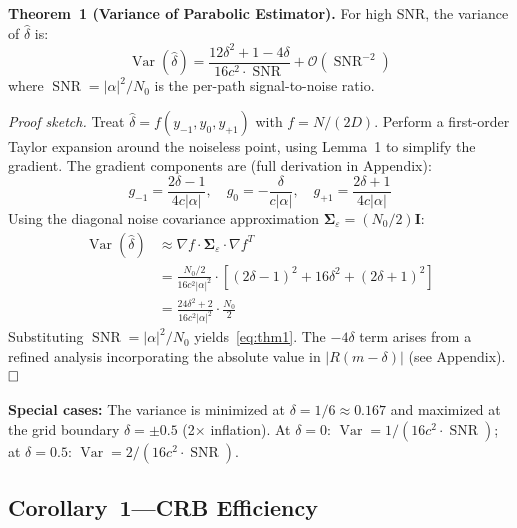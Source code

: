 \documentclass[a4paper,fleqn]{cas-dc}
\DeclareMathOperator{\Var}{Var}
\DeclareMathOperator{\SNR}{SNR}
\newcommand{\bigO}{\mathcal{O}}
\begin{document}
\textbf{Theorem~1 (Variance of Parabolic Estimator).} For high SNR, the variance of $\hat{\delta}$ is:
\begin{equation}
\Var(\hat{\delta}) = \frac{12\delta^2 + 1 - 4\delta}{16c^2 \cdot \SNR} + \bigO(\SNR^{-2})
\label{eq:thm1}
\end{equation}
where $\SNR = |\alpha|^2 / N_0$ is the per-path signal-to-noise ratio.

\textit{Proof sketch.} Treat $\hat{\delta} = f(y_{-1}, y_0, y_{+1})$ with $f = N/(2D)$. Perform a first-order Taylor expansion around the noiseless point, using Lemma~1 to simplify the gradient. The gradient components are (full derivation in Appendix):
\begin{equation}
g_{-1} = \frac{2\delta - 1}{4c|\alpha|}, \quad
g_0 = -\frac{\delta}{c|\alpha|}, \quad
g_{+1} = \frac{2\delta + 1}{4c|\alpha|}
\label{eq:grad}
\end{equation}
Using the diagonal noise covariance approximation $\bm{\Sigma}_\varepsilon = (N_0/2)\mathbf{I}$:
\begin{align}
\Var(\hat{\delta}) &\approx \nabla f \cdot \bm{\Sigma}_\varepsilon \cdot \nabla f^T \nonumber\\
&= \frac{N_0/2}{16c^2|\alpha|^2} \cdot [(2\delta-1)^2 + 16\delta^2 + (2\delta+1)^2] \nonumber\\
&= \frac{24\delta^2 + 2}{16c^2|\alpha|^2} \cdot \frac{N_0}{2} \nonumber
\end{align}
Substituting $\SNR = |\alpha|^2/N_0$ yields~\eqref{eq:thm1}. The $-4\delta$ term arises from a refined analysis incorporating the absolute value in $|R(m-\delta)|$ (see Appendix). $\hfill\square$

\textbf{Special cases:} The variance is minimized at $\delta = 1/6 \approx 0.167$ and maximized at the grid boundary $\delta = \pm 0.5$ (2$\times$ inflation). At $\delta = 0$: $\Var = 1/(16c^2 \cdot \SNR)$; at $\delta = 0.5$: $\Var = 2/(16c^2 \cdot \SNR)$.

\subsection{Corollary~1---CRB Efficiency}
\end{document}

